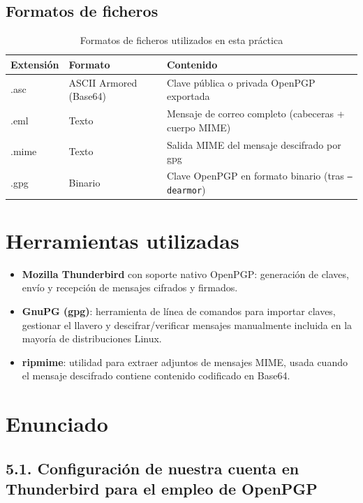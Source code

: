 \subsection{Formatos de ficheros}

\begin{table}[H]
    \centering
    \caption{Formatos de ficheros utilizados en esta práctica}
    \begin{tabularx}{\textwidth}{l|l|X}
        \toprule
        \textbf{Extensión} & \textbf{Formato} & \textbf{Contenido} \\
        \midrule
        .asc & ASCII Armored (Base64) & Clave pública o privada OpenPGP exportada \\
        .eml & Texto & Mensaje de correo completo (cabeceras + cuerpo MIME) \\
        .mime & Texto & Salida MIME del mensaje descifrado por gpg \\
        .gpg & Binario & Clave OpenPGP en formato binario (tras \texttt{--dearmor}) \\
        \bottomrule
    \end{tabularx}
\end{table}

\section{Herramientas utilizadas}

\begin{itemize}[label=\textbullet]
    \item \textbf{Mozilla Thunderbird} con soporte nativo OpenPGP: generación de claves, envío y recepción de mensajes cifrados y firmados.
    \item \textbf{GnuPG (gpg)}: herramienta de línea de comandos para importar claves, gestionar el llavero y descifrar/verificar mensajes manualmente incluida en la mayoría de distribuciones Linux.
    \item \textbf{ripmime}: utilidad para extraer adjuntos de mensajes MIME, usada cuando el mensaje descifrado contiene contenido codificado en Base64.
\end{itemize}

\section{Enunciado}

\subsection*{5.1. Configuración de nuestra cuenta en Thunderbird para el empleo de OpenPGP}

